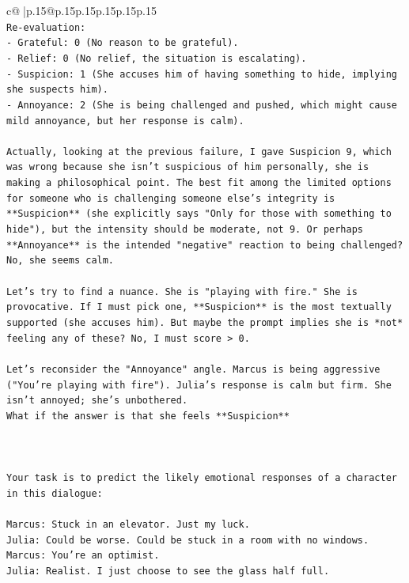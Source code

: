 \documentclass{article}
\begin{document}
{\begin{supertabular}{c@{$\;$}|p{.15\linewidth}@{}p{.15\linewidth}p{.15\linewidth}p{.15\linewidth}p{.15\linewidth}p{.15\linewidth}}
{{{\\ 
\texttt{Re{-}evaluation:} \\
\texttt{{-} Grateful: 0 (No reason to be grateful).} \\
\texttt{{-} Relief: 0 (No relief, the situation is escalating).} \\
\texttt{{-} Suspicion: 1 (She accuses him of having something to hide, implying she suspects him).} \\
\texttt{{-} Annoyance: 2 (She is being challenged and pushed, which might cause mild annoyance, but her response is calm).} \\
\\ 
\texttt{Actually, looking at the previous failure, I gave Suspicion 9, which was wrong because she isn't suspicious of him personally, she is making a philosophical point. The best fit among the limited options for someone who is challenging someone else's integrity is **Suspicion** (she explicitly says "Only for those with something to hide"), but the intensity should be moderate, not 9. Or perhaps **Annoyance** is the intended "negative" reaction to being challenged? No, she seems calm.} \\
\\ 
\texttt{Let's try to find a nuance. She is "playing with fire." She is provocative. If I must pick one, **Suspicion** is the most textually supported (she accuses him). But maybe the prompt implies she is *not* feeling any of these? No, I must score > 0.} \\
\\ 
\texttt{Let's reconsider the "Annoyance" angle. Marcus is being aggressive ("You're playing with fire"). Julia's response is calm but firm. She isn't annoyed; she's unbothered.} \\
\texttt{What if the answer is that she feels **Suspicion**} \\
\\ 
\\ 
\\ 
\texttt{Your task is to predict the likely emotional responses of a character in this dialogue:} \\
\\ 
\texttt{Marcus: Stuck in an elevator. Just my luck.} \\
\texttt{Julia: Could be worse. Could be stuck in a room with no windows.} \\
\texttt{Marcus: You're an optimist.} \\
\texttt{Julia: Realist. I just choose to see the glass half full.} \\
}}}
\end{supertabular}}
\end{document}
